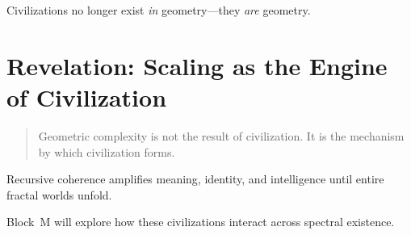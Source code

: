 Civilizations no longer exist \emph{in} geometry—they \emph{are} geometry.

\section{Revelation: Scaling as the Engine of Civilization}
\begin{quote}
Geometric complexity is not the result of civilization.  
It is the mechanism by which civilization forms.
\end{quote}

Recursive coherence amplifies meaning, identity, and intelligence until entire fractal worlds unfold.

Block~M will explore how these civilizations interact across spectral existence.

